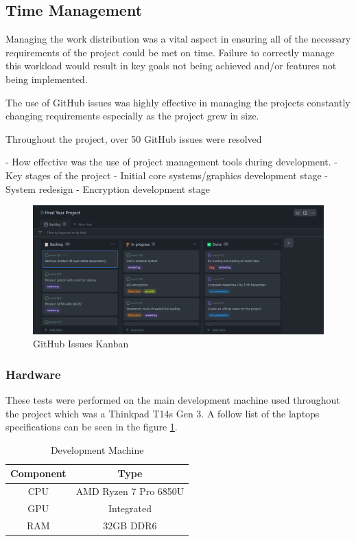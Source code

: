 \documentclass[11pt]{article}
\begin{document}
\subsection{Time Management}
Managing the work distribution was a vital aspect in ensuring all of the
necessary requirements of the project could be met on time. Failure to correctly 
manage this workload would result in key goals not being achieved and/or features
not being implemented.



The use of GitHub issues was highly effective in managing the projects
constantly changing requirements especially as the project grew in size.

Throughout the project, over 50 GitHub issues were resolved 

- How effective was the use of project management tools
during development.
- Key stages of the project
    - Initial core systems/graphics development stage
    - System redesign
    - Encryption development stage

\begin{figure}[H]
  \centering
  \includegraphics[width=\textwidth]{images/github_project.png}
  \caption{GitHub Issues Kanban}
  \label{fig:github_kanban}
\end{figure}
    


\subsubsection{Hardware}
These tests were performed on the main development machine used throughout the
project which was a Thinkpad T14s Gen 3. A follow list of the laptops specifications
can be seen in the figure \ref{fig:development_machine}.

\begin{table}[H]
\centering
\begin{tabular}{|| c c ||} 
  \hline
  Component & Type \\ [0.5ex] 
  \hline\hline
  CPU & AMD Ryzen 7 Pro 6850U  \\ 
  GPU & Integrated \\
  RAM & 32GB DDR6 \\ [1ex] 
  \hline
\end{tabular}
\caption{Development Machine}
\label{fig:development_machine}
\end{table}
\end{document}
